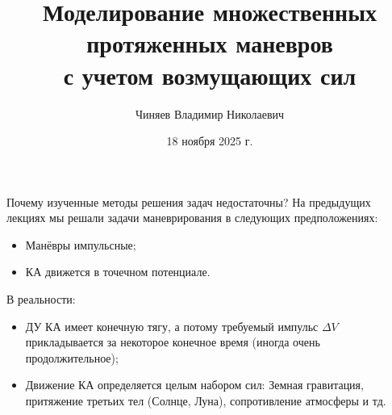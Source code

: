 \documentclass[8pt]{beamer}
\author[Автор]{Чиняев Владимир Николаевич}
\title{Моделирование множественных протяженных маневров \\ с учетом возмущающих сил}
\institute[]{Московский физико технический институт}
\date{18 ноября 2025 г.}
\begin{document}
\begin{frame}
\titlepage
\end{frame}

\begin{frame}{Почему изученные методы решения задач недостаточны?}
На предыдущих лекциях мы решали задачи маневрирования в следующих предположениях:
\begin{itemize}
    \item Манёвры импульсные;
    \item КА движется в точечном потенциале.
\end{itemize}
В реальности:
\begin{itemize}
    \item ДУ КА имеет конечную тягу, а потому требуемый импульс $\Delta V$ прикладывается за некоторое конечное время (иногда очень продолжительное);
    \item Движение КА определяется целым набором сил: Земная гравитация, притяжение третьих тел (Солнце, Луна), сопротивление атмосферы и тд.  
\end{itemize}
\end{frame}
\end{document}
